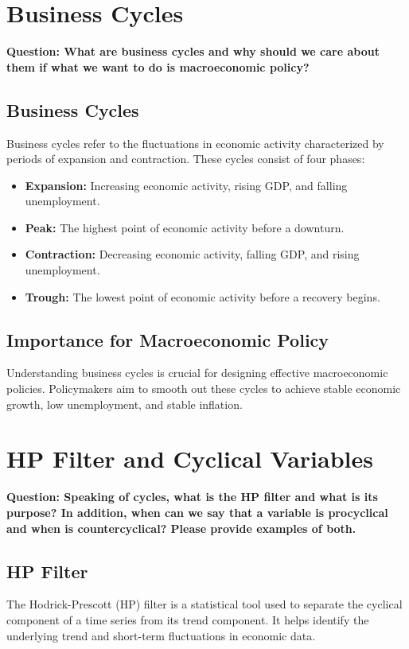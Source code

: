 \documentclass{article}
\begin{document}
\section{Business Cycles}
\textbf{Question: What are business cycles and why should we care about them if what we want to do is macroeconomic policy?}

\subsection{Business Cycles}
Business cycles refer to the fluctuations in economic activity characterized by periods of expansion and contraction. These cycles consist of four phases:
\begin{itemize}
    \item \textbf{Expansion:} Increasing economic activity, rising GDP, and falling unemployment.
    \item \textbf{Peak:} The highest point of economic activity before a downturn.
    \item \textbf{Contraction:} Decreasing economic activity, falling GDP, and rising unemployment.
    \item \textbf{Trough:} The lowest point of economic activity before a recovery begins.
\end{itemize}

\subsection{Importance for Macroeconomic Policy}
Understanding business cycles is crucial for designing effective macroeconomic policies. Policymakers aim to smooth out these cycles to achieve stable economic growth, low unemployment, and stable inflation.

\section{HP Filter and Cyclical Variables}
\textbf{Question: Speaking of cycles, what is the HP filter and what is its purpose? In addition, when can we say that a variable is procyclical and when is countercyclical? Please provide examples of both.}

\subsection{HP Filter}
The Hodrick-Prescott (HP) filter is a statistical tool used to separate the cyclical component of a time series from its trend component. It helps identify the underlying trend and short-term fluctuations in economic data.
\end{document}
